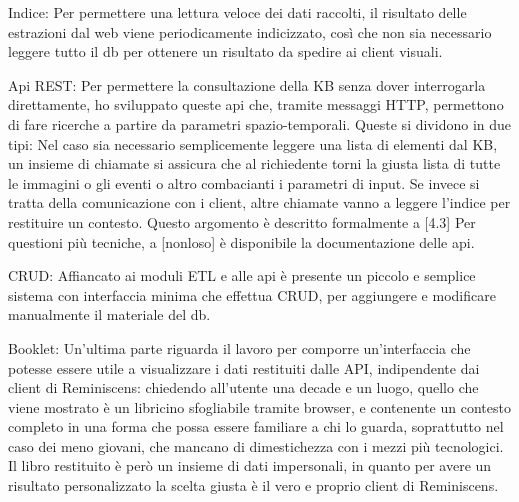 \documentclass[sigproc-sp.tex]{subfiles}
\begin{document}
Indice: Per permettere una lettura veloce dei dati raccolti, il risultato delle estrazioni dal web viene periodicamente indicizzato, così che non sia necessario leggere tutto il db per ottenere un risultato da spedire ai client visuali.

Api REST: Per permettere la consultazione della KB senza dover interrogarla direttamente, ho sviluppato queste api che, tramite messaggi HTTP, permettono di fare ricerche a partire da parametri spazio-temporali. Queste si dividono in due tipi:
Nel caso sia necessario semplicemente leggere una lista di elementi dal KB, un insieme di chiamate si assicura che al richiedente torni la giusta lista di tutte le immagini o gli eventi o altro combacianti i parametri di input.
Se invece si tratta della comunicazione con i client, altre chiamate vanno a leggere l’indice per restituire un contesto. Questo argomento è descritto formalmente a [4.3]
Per questioni più tecniche, a [nonloso] è disponibile la documentazione delle api.

CRUD: Affiancato ai moduli ETL e alle api è presente un piccolo e semplice sistema con interfaccia minima che effettua CRUD, per aggiungere e modificare manualmente il materiale del db.

Booklet: Un’ultima parte riguarda il lavoro per comporre un’interfaccia che potesse essere utile a visualizzare i dati restituiti dalle API, indipendente dai client di Reminiscens: chiedendo all’utente una decade e un luogo, quello che viene mostrato è un libricino sfogliabile tramite browser, e contenente un contesto completo in una forma che possa essere familiare a chi lo guarda, soprattutto nel caso dei meno giovani, che mancano di dimestichezza con i mezzi più tecnologici. Il libro restituito è però un insieme di dati impersonali, in quanto per avere un risultato personalizzato la scelta giusta è il vero e proprio client di Reminiscens.
\end{document}
